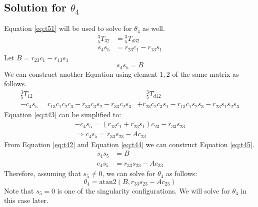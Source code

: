 \subsection{Solution for $\theta_4$}
Equation \ref{eq:t51} will be used to solve for $\theta_4$ as well.
\begin{equation} \label{eq:t41}
    \begin{aligned}
        {_5^{3}}T_{32} & ={_5^{3}}T_{d32}       \\
        s_4s_5         & =r_{23}c_1 - r_{13}s_1
    \end{aligned}
\end{equation}
Let $B=r_{23}c_1 - r_{13}s_1$
\begin{equation} \label{eq:t42}
    s_4s_5=B
\end{equation}
We can construct another Equation using element $1, 2$ of the same matrix as follows.
\begin{equation} \label{eq:t43}
    \begin{aligned}
        {_5^{3}}T_{12}                                        & ={_5^{3}}T_{d12}                                      \\
        -c_4s_5=r_{13}c_1c_2c_3 - r_{33}c_3s_2 - r_{33}c_2s_3 & + r_{23}c_2c_3s_1 - r_{13}c_1s_2s_3 - r_{23}s_1s_2s_3
    \end{aligned}
\end{equation}
Equation \ref{eq:t43} can be simplified to:
\begin{equation} \label{eq:t44}
    \begin{aligned}
        -c_4s_5=(r_{13}c_1+r_{23}s_1)c_{23}-r_{33}s_{23} \\
        \Rightarrow c_4s_5=r_{33}s_{23}-Ac_{23}
    \end{aligned}
\end{equation}
From Equation \ref{eq:t42} and Equation \ref{eq:t44} we can construct Equation \ref{eq:t45}.
\begin{equation} \label{eq:t45}
    \begin{aligned}
        s_4s_5 & =B                    \\
        c_4s_5 & =r_{33}s_{23}-Ac_{23}
    \end{aligned}
\end{equation}
Therefore, assuming that $s_5\neq0$, we can solve for $\theta_4$ as follows:
\begin{equation} \label{eq:t46}
    \theta_4=\mathrm{atan2}(B, r_{33}s_{23}-Ac_{23})
\end{equation}
Note that $s_5=0$ is one of the singularity configurations. We will solve for $\theta_4$ in this case later.
